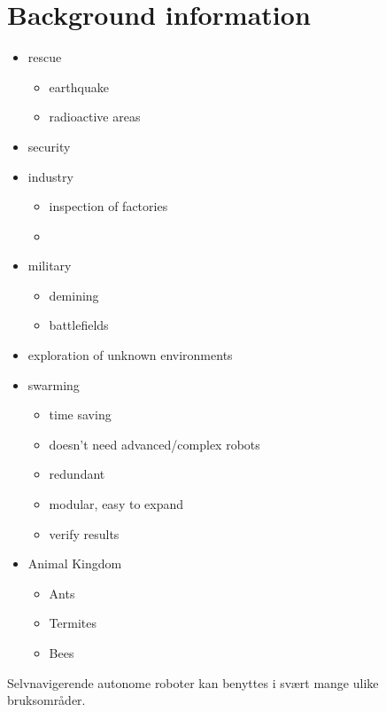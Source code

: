 \section{Background information}
\begin{itemize}
    \item rescue
    \begin{itemize}
        \item earthquake
        \item radioactive areas
    \end{itemize}
    \item security
    \item industry
    \begin{itemize}
        \item inspection of factories
        \item 
    \end{itemize}
    \item military
    \begin{itemize}
        \item demining
        \item battlefields
    \end{itemize}
    \item exploration of unknown environments
    \item swarming
    \begin{itemize}
        \item time saving
        \item doesn't need advanced/complex robots
        \item redundant
        \item modular, easy to expand
        \item verify results
    \end{itemize}
    \item Animal Kingdom
    \begin{itemize}
        \item Ants
        \item Termites
        \item Bees
    \end{itemize}
\end{itemize}

Selvnavigerende autonome roboter kan benyttes i svært mange ulike bruksområder.

